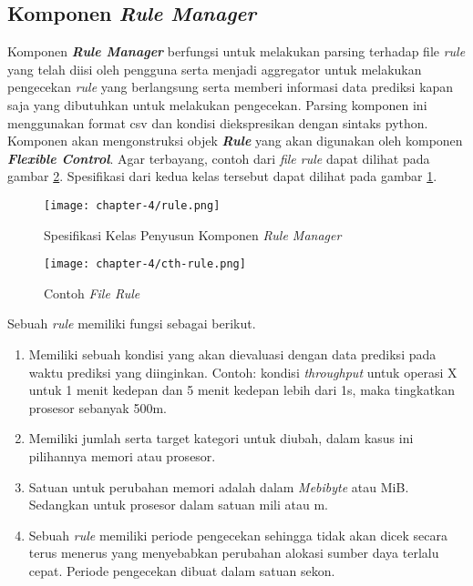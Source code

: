 \subsection{Komponen \textit{Rule Manager}}
Komponen \textbf{\textit{Rule Manager}} berfungsi untuk melakukan parsing terhadap file \textit{rule} yang telah diisi oleh pengguna serta menjadi aggregator untuk melakukan pengecekan \textit{rule} yang berlangsung serta memberi informasi data prediksi kapan saja yang dibutuhkan untuk melakukan pengecekan. Parsing komponen ini menggunakan format csv dan kondisi diekspresikan dengan sintaks python. Komponen akan mengonstruksi objek \textbf{\textit{Rule}} yang akan digunakan oleh komponen \textbf{\textit{Flexible Control}}. Agar terbayang, contoh dari \textit{file rule} dapat dilihat pada gambar \ref{fig:rule-example}. Spesifikasi dari kedua kelas tersebut dapat dilihat pada gambar \ref{fig:rule-spek}.

\begin{figure}[h]
    \centering
    \texttt{[image: chapter-4/rule.png]}
    \caption{Spesifikasi Kelas Penyusun Komponen \textit{Rule Manager}}
    \label{fig:rule-spek}
\end{figure}

\begin{figure}[h]
    \centering
    \texttt{[image: chapter-4/cth-rule.png]}
    \caption{Contoh \textit{File Rule}}
    \label{fig:rule-example}
\end{figure}

Sebuah \textit{rule} memiliki fungsi sebagai berikut.
\begin{enumerate}
    \item Memiliki sebuah kondisi yang akan dievaluasi dengan data prediksi pada waktu prediksi yang diinginkan. Contoh: kondisi \textit{throughput} untuk operasi X untuk 1 menit kedepan dan 5 menit kedepan lebih dari 1s, maka tingkatkan prosesor sebanyak 500m.
    \item Memiliki jumlah serta target kategori untuk diubah, dalam kasus ini pilihannya memori atau prosesor.
    \item Satuan untuk perubahan memori adalah dalam \textit{Mebibyte} atau MiB. Sedangkan untuk prosesor dalam satuan mili atau m.
    \item Sebuah \textit{rule} memiliki periode pengecekan sehingga tidak akan dicek secara terus menerus yang menyebabkan perubahan alokasi sumber daya terlalu cepat. Periode pengecekan dibuat dalam satuan sekon.
\end{enumerate}

